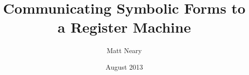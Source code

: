 \documentclass[11pt]{article}
\begin{document}
\begin{titlepage}
\title{Communicating Symbolic Forms to a Register Machine}
\author{Matt Neary}
\date{August 2013}
\maketitle
\thispagestyle{empty}
\end{titlepage}
\end{document}
